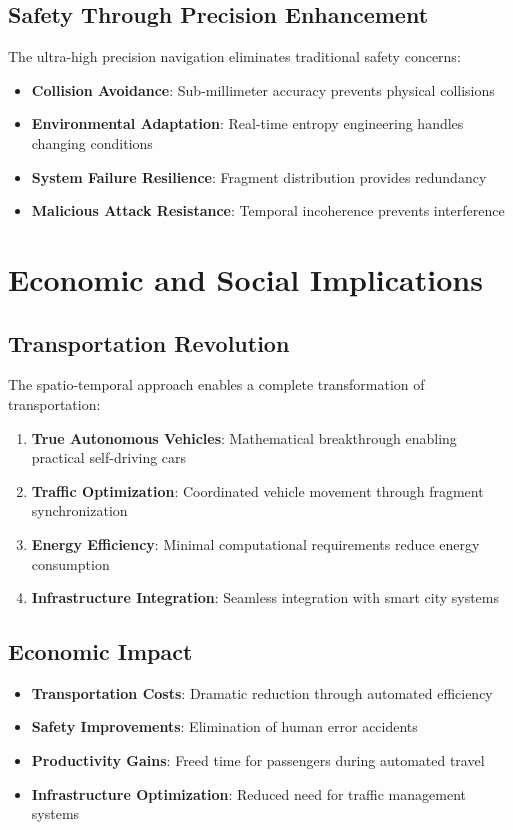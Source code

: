 \documentclass[12pt,a4paper]{article}
\begin{document}
\subsection{Safety Through Precision Enhancement}

The ultra-high precision navigation eliminates traditional safety concerns:

\begin{itemize}
\item \textbf{Collision Avoidance}: Sub-millimeter accuracy prevents physical collisions
\item \textbf{Environmental Adaptation}: Real-time entropy engineering handles changing conditions
\item \textbf{System Failure Resilience}: Fragment distribution provides redundancy
\item \textbf{Malicious Attack Resistance}: Temporal incoherence prevents interference
\end{itemize}

\section{Economic and Social Implications}

\subsection{Transportation Revolution}

The spatio-temporal approach enables a complete transformation of transportation:

\begin{enumerate}
\item \textbf{True Autonomous Vehicles}: Mathematical breakthrough enabling practical self-driving cars
\item \textbf{Traffic Optimization}: Coordinated vehicle movement through fragment synchronization
\item \textbf{Energy Efficiency}: Minimal computational requirements reduce energy consumption
\item \textbf{Infrastructure Integration}: Seamless integration with smart city systems
\end{enumerate}

\subsection{Economic Impact}

\begin{itemize}
\item \textbf{Transportation Costs}: Dramatic reduction through automated efficiency
\item \textbf{Safety Improvements}: Elimination of human error accidents
\item \textbf{Productivity Gains}: Freed time for passengers during automated travel
\item \textbf{Infrastructure Optimization}: Reduced need for traffic management systems
\end{itemize}
\end{document}
